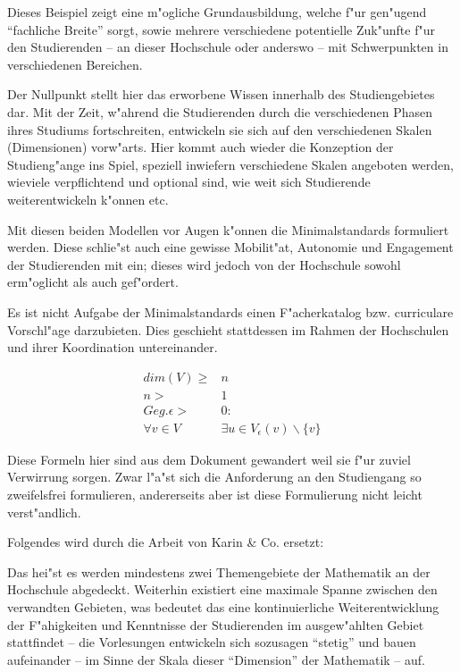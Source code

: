 \begin{kcmt6XX}
Dieses Beispiel zeigt eine m"ogliche Grundausbildung, welche f"ur gen"ugend "`fachliche
Breite"' sorgt, sowie mehrere verschiedene potentielle Zuk"unfte f"ur den Studierenden
-- an dieser Hochschule oder anderswo -- mit Schwerpunkten in verschiedenen Bereichen.

Der Nullpunkt stellt hier das erworbene Wissen innerhalb des Studiengebietes dar.
Mit der Zeit, w"ahrend die Studierenden durch die verschiedenen Phasen ihres Studiums
fortschreiten, entwickeln sie sich auf den verschiedenen Skalen (Dimensionen)
vorw"arts. Hier kommt auch wieder die Konzeption der Studieng"ange ins Spiel, speziell
inwiefern verschiedene Skalen angeboten werden, wieviele verpflichtend und optional
sind, wie weit sich Studierende weiterentwickeln k"onnen etc.

Mit diesen beiden Modellen vor Augen k"onnen die Minimalstandards formuliert werden.
Diese schlie"st auch eine gewisse Mobilit"at, Autonomie und Engagement
der Studierenden mit ein; dieses wird jedoch von der Hochschule sowohl erm"oglicht
als auch gef"ordert.

Es ist nicht Aufgabe der Minimalstandards einen F"acherkatalog bzw. curriculare
Vorschl"age darzubieten. Dies geschieht stattdessen im Rahmen der Hochschulen und
ihrer Koordination untereinander.

\begin{kcmt62}
\begin{komacmt62}
\begin{eqnarray*}
	dim(V) \geq & n \\
	n > & 1 \\
	Geg. \epsilon > & 0:\\
	\forall  v \in V & \exists u \in V_\epsilon(v) \backslash \{v\}
\end{eqnarray*}

Diese Formeln hier sind aus dem Dokument gewandert weil sie f"ur zuviel
Verwirrung sorgen. Zwar l"a"st sich die Anforderung an den Studiengang
so zweifelsfrei formulieren, andererseits aber ist diese Formulierung
nicht leicht verst"andlich.
\end{komacmt62}
\end{kcmt62}

\begin{kcmt62}
\begin{komacmt62}
Folgendes wird durch die Arbeit von Karin \& Co. ersetzt:

Das hei"st es werden mindestens zwei Themengebiete der Mathematik an der Hochschule
abgedeckt. Weiterhin existiert eine maximale Spanne zwischen den verwandten
Gebieten, was bedeutet das eine kontinuierliche Weiterentwicklung der F"ahigkeiten
und Kenntnisse der Studierenden im ausgew"ahlten Gebiet stattfindet -- die Vorlesungen
entwickeln sich sozusagen "`stetig"' und bauen aufeinander -- im Sinne der Skala dieser
"`Dimension"' der Mathematik -- auf.
\end{komacmt62}
\end{kcmt62}

\end{kcmt6XX}

